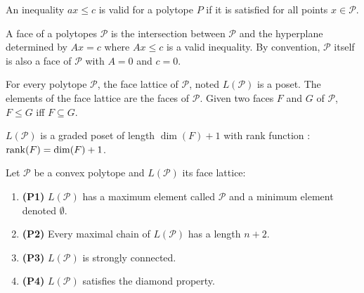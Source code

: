 \begin{definition}
  An inequality $ax \le c$ is valid for a polytope $P$ if it is satisfied for all points $x \in \mathcal P$.
\end{definition}

\begin{definition}
  A face of a polytopes $\mathcal P$ is the intersection between $\mathcal P$ and the hyperplane determined by $Ax = c$ where $Ax \le c$ is a valid inequality. By convention, $\mathcal P$ itself is also a face of $\mathcal P$ with $A=0$ and $c=0$.
\end{definition}

\begin{definition}
  For every polytope $\mathcal P$, the face lattice of $\mathcal P$, noted $L(\mathcal P)$ is a poset. The elements of the face lattice are the faces of $\mathcal P$. Given two faces $F$ and $G$ of $\mathcal P$, $F \le G$ iff $F \subseteq G$.
\end{definition}

\begin{property}
  $L(\mathcal P)$ is a graded poset of length $\dim(F) + 1$ with rank function : $\operatorname{rank}(F) = \dim(F) + 1$.
\end{property}

\begin{proposition}
  Let $\mathcal P$ be a convex polytope and $L(\mathcal P)$ its face lattice:

  \begin{enumerate}
    \item \textbf{(P1)} $L(\mathcal P)$ has a maximum element called $\mathcal P$ and a minimum element denoted $\emptyset$.
    \item \textbf{(P2)} Every maximal chain of $L(\mathcal P)$ has a length $n + 2$.
    \item \textbf{(P3)} $L(\mathcal P)$ is strongly connected.
    \item \textbf{(P4)} $L(\mathcal P)$ satisfies the diamond property.
  \end{enumerate}
\end{proposition}
